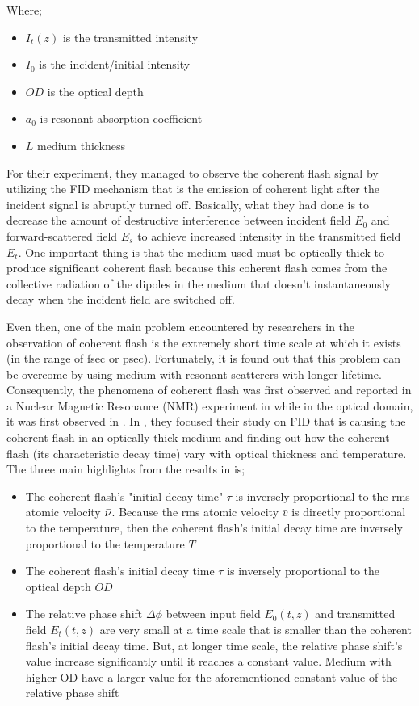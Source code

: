 Where;

\begin{itemize}
    \item $I_{t}(z)$ is the transmitted intensity
    \item $I_{0}$ is the incident/initial intensity
    \item $OD$ is the optical depth
    \item $a_{0}$ is resonant absorption coefficient
    \item $L$ medium thickness
\end{itemize}

For their experiment, they managed to observe the coherent flash signal by utilizing the FID mechanism that is the emission of coherent light after the incident signal is abruptly turned off. Basically, what they had done is to decrease the amount of destructive interference between incident field $E_0$ and forward-scattered field $E_s$ to achieve increased intensity in the transmitted field $E_t$. One important thing is that the medium used must be optically thick to produce significant coherent flash because this coherent flash comes from the collective radiation of the dipoles in the medium that doesn't instantaneously decay when the incident field are switched off.

Even then, one of the main problem encountered by researchers in the observation of coherent flash is the extremely short time scale at which it exists (in the range of fsec or psec). Fortunately, it is found out that this problem can be overcome by using medium with resonant scatterers with longer lifetime. Consequently, the phenomena of coherent flash was first observed and reported in a Nuclear Magnetic Resonance (NMR) experiment in  while in the optical domain, it was first observed in . In , they focused their study on FID that is causing the coherent flash in an optically thick medium and finding out how the coherent flash (its characteristic decay time) vary with optical thickness and temperature. The three main highlights from the results in  is;

\begin{itemize}
    \item The coherent flash's "initial decay time" $\tau$ is inversely proportional to the rms atomic velocity $\Bar{\nu}$. Because the rms atomic velocity $\bar{v}$ is directly proportional to the temperature, then the coherent flash's initial decay time are inversely proportional to the temperature $T$
    \item The coherent flash's initial decay time $\tau$ is inversely proportional to the optical depth $OD$
    \item The relative phase shift $\Delta\phi$ between input field $E_{0}(t, z)$ and transmitted field $E_{t}(t, z)$ are very small at a time scale that is smaller than the coherent flash's initial decay time. But, at longer time scale, the relative phase shift's value increase significantly until it reaches a constant value. Medium with higher OD have a larger value for the aforementioned constant value of the relative phase shift
\end{itemize}

